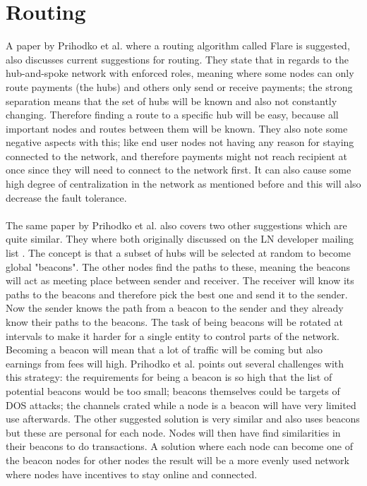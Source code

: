 \documentclass[informationsecurity]{gucmasterproject}
\begin{document}
\section{Routing}
A paper by Prihodko et al. where a routing algorithm called Flare\cite{prihodko2016flare} is suggested, also discusses current suggestions for routing. 
They state that in regards to the hub-and-spoke network with enforced roles, meaning where some nodes can only route payments (the hubs) and others only send or receive payments; the strong separation means that the set of hubs will be known and also not constantly changing. Therefore finding a route to a specific hub will be easy, because all important nodes and routes between them will be known.
They also note some negative aspects with this; like 
end user nodes not having any reason for staying connected to the network, and therefore payments might not reach recipient at once since they will need to connect to the network first.
It can also cause some high degree of centralization in the network as mentioned before and this will also decrease the fault tolerance.

\paragraph{}
The  same paper by Prihodko et al.\cite{prihodko2016flare} also covers two other suggestions which are quite similar.
They where both originally discussed on the LN developer mailing list\cite{rusty_routing1} \cite{rusty_routing2} \cite{rusty_routing3}. The concept is that a subset of hubs will be selected at random to become global "beacons". The other nodes find the paths to these, meaning the beacons will act as meeting place between sender and receiver. The receiver will know its paths to the beacons and therefore pick the best one and send it to the sender. Now the sender knows the path from a beacon to the sender and they already know their paths to the beacons. The task of being beacons will be rotated at intervals to make it harder for a single entity to control parts of the network. Becoming a beacon will mean that a lot of traffic will be coming but also earnings from fees will high.
Prihodko et al. points out several challenges with this strategy: the requirements for being a beacon is so high that the list of potential beacons would be too small; beacons themselves could be targets of DOS attacks; the channels crated while a node is a beacon will have very limited use afterwards. The other suggested solution is very similar and also uses beacons but these are personal for each node. Nodes will then have find similarities in their beacons to do transactions. A solution where each node can become one of the beacon nodes for other nodes the result will be a more evenly used network where nodes have incentives to stay online and connected.
\end{document}

